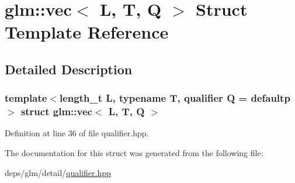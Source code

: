 \hypertarget{structglm_1_1vec}{}\section{glm\+:\+:vec$<$ L, T, Q $>$ Struct Template Reference}
\label{structglm_1_1vec}


\subsection{Detailed Description}
\subsubsection*{template$<$length\+\_\+t L, typename T, qualifier Q = defaultp$>$\newline
struct glm\+::vec$<$ L, T, Q $>$}



Definition at line 36 of file qualifier.\+hpp.



The documentation for this struct was generated from the following file\+:\begin{DoxyCompactItemize}
\item 
deps/glm/detail/\hyperlink{qualifier_8hpp}{qualifier.\+hpp}\end{DoxyCompactItemize}
